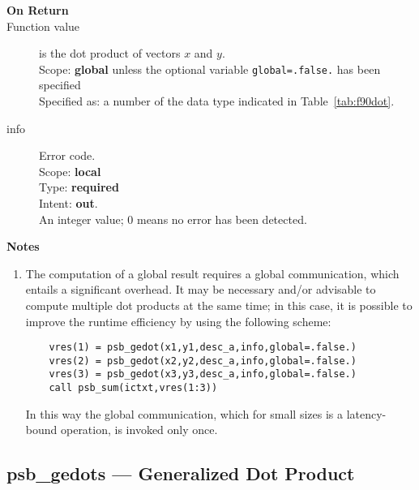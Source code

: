 \begin{description}
\item[\bf On Return] 
\item[Function value] is the dot product of vectors $x$ and $y$.\\
Scope: {\bf global}  unless the optional variable
\verb|global=.false.| has been specified\\
Specified as: a number of the data type indicated in Table~\ref{tab:f90dot}.
\item[info] Error code.\\
Scope: {\bf local} \\
Type: {\bf required} \\
Intent: {\bf out}.\\
An integer value; 0 means no error has been detected. 
\end{description}

{\par\noindent\large\bfseries Notes}
\begin{enumerate}
\item The computation of a global result requires a global
  communication, which entails a significant overhead. It may be
  necessary and/or advisable to compute multiple dot products at the same 
  time; in this case, it is possible to improve the runtime efficiency
  by using the following scheme:
  \begin{lstlisting}
    vres(1) = psb_gedot(x1,y1,desc_a,info,global=.false.)
    vres(2) = psb_gedot(x2,y2,desc_a,info,global=.false.)
    vres(3) = psb_gedot(x3,y3,desc_a,info,global=.false.)
    call psb_sum(ictxt,vres(1:3))
  \end{lstlisting}
  In this way the global communication, which for small sizes is a
  latency-bound operation, is invoked only once.
\end{enumerate}

%
%

\clearpage\subsection*{psb\_gedots --- Generalized Dot Product}

